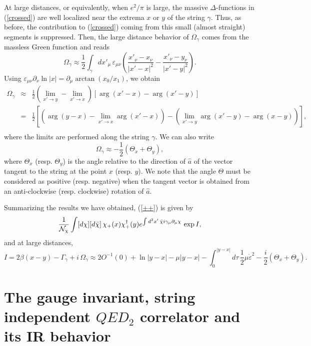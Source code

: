 \documentclass[a4paper,12pt]{article}
\begin{document}
At large distances, or equivalently, when $e^2/\pi$ is large, the massive $\Delta$-functions in (\ref{crossed}) are well localized near the extrema $x$ or $y$ of the string $\gamma$.  Thus, as before, the contribution to (\ref{crossed}) coming from this small (almost straight) segments is suppressed. Then, the large distance behavior of $\Omega_\gamma$ comes from the massless Green function and reads
\begin{equation}
\Omega_\gamma\approx\frac{1}{2}\int_\gamma dx'_\mu\, \varepsilon_{\mu \nu}\left(\frac{x'_\nu-x_\nu}{|x'-x|^2} -\frac{x'_\nu-y_\nu}{|x'-y|^2} \right).
\end{equation}
Using $\varepsilon_{\mu \nu}\partial_\nu \ln |x|=\partial_\mu \arctan (x_0/x_1)$, we obtain
\begin{eqnarray}
\Omega_\gamma&\approx &\frac{1}{2}\left( \lim_{x'\to y}-\lim_{x'\to x}\right)[\arg (x'-x)-\arg (x'-y)]
\nonumber \\
& = &\frac{1}{2}\left[ \left( \arg (y-x) -\lim_{x'\to x}\arg (x'-x)\right)-
\left( \lim_{x'\to y}\arg (x'-y) - \arg (x-y)\right) \right],\nonumber \\
\end{eqnarray}
where the limits are performed along the string $\gamma$. We can also write
\begin{equation}
\Omega_\gamma \approx -\frac{1}{2}(\Theta_x +\Theta_y),
\label{omap}
\end{equation}
where $\Theta_x$ (resp. $\Theta_y$) is the angle relative to the direction of $\hat{a}$ of 
the vector tangent to the string at the point $x$ (resp. $y$). We note that the angle $\Theta$ must be considered as positive (resp. negative) when the tangent vector is obtained from an anti-clockwise (resp. clockwise) rotation of $\hat{a}$.

Summarizing the results we have obtained, (\ref{++}) is given by
\begin{equation}
\frac{1}{{\cal N}_\chi}\int [d\chi][d\bar{\chi}]\,\chi_+ (x)\chi^\dagger_+(y) e^{\int d^2x'\, \bar{\chi}i\gamma_{\mu}\partial_{\mu} \chi} \, \exp {I},
\label{chi1}
\end{equation}
and at large distances,
\begin{equation}
I=2\beta (x- y) - \Gamma_\gamma + i\,\Omega_\gamma\approx 2O^{-1}(0)+\ln |y-x|-\mu |y-x| - \int_0^{|y-x|} d\tau\, \frac{1}{2}\mu \dot{\varepsilon}^2
-\frac{i}{2}(\Theta_x +\Theta_y).
\label{I1}
\end{equation}

\section{The gauge invariant, string independent $QED_2$ correlator and its IR behavior}
\end{document}
